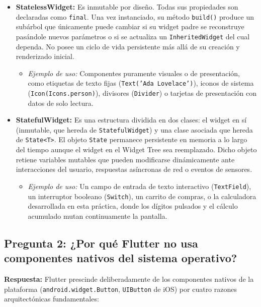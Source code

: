 \documentclass[12pt,a4paper]{article}
\begin{document}
\begin{itemize}
    \item \textbf{StatelessWidget:} Es inmutable por diseño. Todas sus propiedades son declaradas como \texttt{final}. Una vez instanciado, su método \texttt{build()} produce un subárbol que únicamente puede cambiar si su widget padre se reconstruye pasándole nuevos parámetros o si se actualiza un \texttt{InheritedWidget} del cual dependa. No posee un ciclo de vida persistente más allá de su creación y renderizado inicial.
    \begin{itemize}[noitemsep]
        \item \textit{Ejemplo de uso:} Componentes puramente visuales o de presentación, como etiquetas de texto fijas (\texttt{Text('Ada Lovelace')}), iconos de sistema (\texttt{Icon(Icons.person)}), divisores (\texttt{Divider}) o tarjetas de presentación con datos de solo lectura.
    \end{itemize}

    \item \textbf{StatefulWidget:} Es una estructura dividida en dos clases: el widget en sí (inmutable, que hereda de \texttt{StatefulWidget}) y una clase asociada que hereda de \texttt{State<T>}. El objeto \texttt{State} permanece persistente en memoria a lo largo del tiempo aunque el widget en el Widget Tree sea reemplazado. Dicho objeto retiene variables mutables que pueden modificarse dinámicamente ante interacciones del usuario, respuestas asíncronas de red o eventos de sensores.
    \begin{itemize}[noitemsep]
        \item \textit{Ejemplo de uso:} Un campo de entrada de texto interactivo (\texttt{TextField}), un interruptor booleano (\texttt{Switch}), un carrito de compras, o la calculadora desarrollada en esta práctica, donde los dígitos pulsados y el cálculo acumulado mutan continuamente la pantalla.
    \end{itemize}
\end{itemize}

\subsection{Pregunta 2: ¿Por qué Flutter no usa componentes nativos del sistema operativo?}
\textbf{Respuesta:}
Flutter prescinde deliberadamente de los componentes nativos de la plataforma (\texttt{android.widget.Button}, \texttt{UIButton} de iOS) por cuatro razones arquitectónicas fundamentales:
\end{document}
